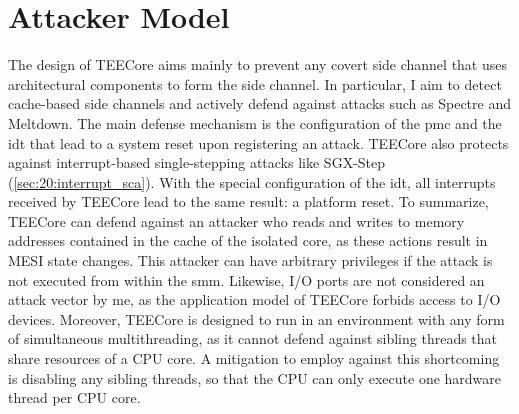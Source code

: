 \section{Attacker Model}
\label{sec:30:tee_attacker_model}
The design of TEECore aims mainly to prevent any covert side channel that uses
architectural components to form the side channel. In particular, I aim to
detect cache-based side channels and actively defend against attacks such as
Spectre and Meltdown. The main defense mechanism is the configuration of the
\gls{pmc} and the \gls{idt} that lead to a system reset upon registering an
attack.
TEECore also protects against interrupt-based single-stepping attacks like
SGX-Step (\ref{sec:20:interrupt_sca}). With the special configuration of the
\gls{idt}, all interrupts received by TEECore lead to the same result: a
platform reset. To summarize, TEECore can defend against an attacker who reads
and writes to memory addresses contained in the cache of the isolated core, as
these actions result in MESI state changes. This attacker can have arbitrary
privileges if the attack is not executed from within the \gls{smm}. Likewise,
I/O ports are not considered an attack vector by me, as the application model of
TEECore forbids access to I/O devices. Moreover, TEECore is designed to run in
an environment with any form of simultaneous multithreading, as it cannot defend
against sibling threads that share resources of a CPU core. A mitigation to
employ against this shortcoming is disabling any sibling threads, so that the
CPU can only execute one hardware thread per CPU core.\\

